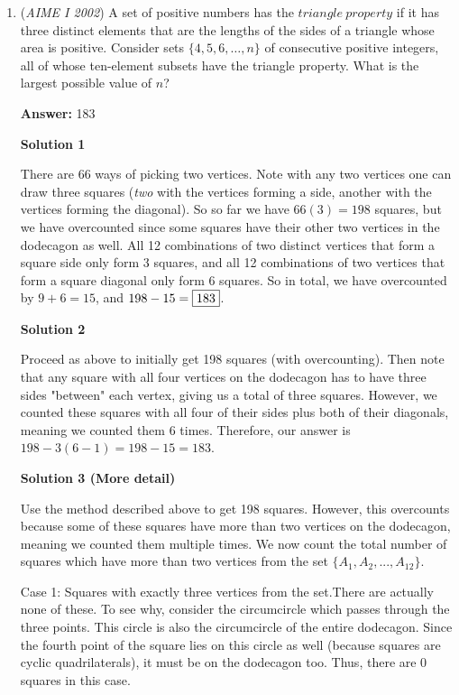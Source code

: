 \begin{enumerate}
	\item (\textit{AIME I 2002}) A set of positive numbers has the $triangle~property$ if it has three distinct elements that are the lengths of the sides of a triangle whose area is positive. Consider sets $\{4, 5, 6, \ldots, n\}$ of consecutive positive integers, all of whose ten-element subsets have the triangle property. What is the largest possible value of $n$?


 
 \textbf{Answer: }183



\textbf{Solution 1}

There are 66 ways of picking two vertices. Note with any two vertices one can draw three squares (\textit{two} with the vertices forming a side, another with the vertices forming the diagonal). So so far we have $66(3)=198$ squares, but we have overcounted since some squares have their other two vertices in the dodecagon as well. All 12 combinations of two distinct vertices that form a square side only form 3 squares, and all 12 combinations of two vertices that form a square diagonal only form 6 squares. So in total, we have overcounted by $9+6=15$, and $198-15=\fbox{183}$.

 



\textbf{Solution 2}

Proceed as above to initially get 198 squares (with overcounting). Then note that any square with all four vertices on the dodecagon has to have three sides "between" each vertex, giving us a total of three squares. However, we counted these squares with all four of their sides plus both of their diagonals, meaning we counted them 6 times. Therefore, our answer is $198-3(6-1)=198-15=\boxed{183}.$




\textbf{Solution 3 (More detail)}

Use the method described above to get 198 squares. However, this overcounts because some of these squares have more than two vertices on the dodecagon, meaning we counted them multiple times. We now count the total number of squares which have more than two vertices from the set $\{A_1, A_2, ..., A_{12}\}$.

 Case 1: Squares with exactly three vertices from the set.There are actually none of these. To see why, consider the circumcircle which passes through the three points. This circle is also the circumcircle of the entire dodecagon. Since the fourth point of the square lies on this circle as well (because squares are cyclic quadrilaterals), it must be on the dodecagon too. Thus, there are 0 squares in this case.


\end{enumerate}
